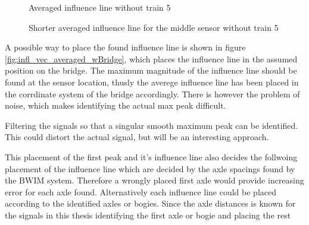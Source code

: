 \begin{figure}[H]
	\begin{adjustbox}{center}
		
	\end{adjustbox}
	\caption{Averaged influence line without train 5}
	\label{fig:infl_vec_averaged_wo_train5}
\end{figure}

\begin{figure}[H]
	\begin{adjustbox}{center}
		
	\end{adjustbox}
	\caption{Shorter averaged influence line for the middle sensor without train 5}
	\label{fig:infl_vec_averaged_fft10hz}
\end{figure}

A possible way to place the found influence line is shown in figure \ref{fig:infl_vec_averaged_wBridge}, which places the influence line in the assumed position on the bridge. The maximum magnitude of the influence line should be found at the sensor location, thusly the averege influence line has been placed in the corrdinate system of the bridge accordingly. There is however the problem of noise, which makes identifying the actual max peak difficult.

Filtering the signals so that a singular smooth maximum peak can be identified. This could distort the actual signal, but will be an interesting approach.

This placement of the first peak and it's influence line also decides the follwoing placement of the influence line which are decided by the axle spacings found by the BWIM system. Therefore a wrongly placed first axle would provide increasing error for each axle found.
Alternatively each influence line could be placed according to the identified axles or bogies. Since the axle distances is known for the signals in this thesis identifying the first axle or bogie and placing the rest
